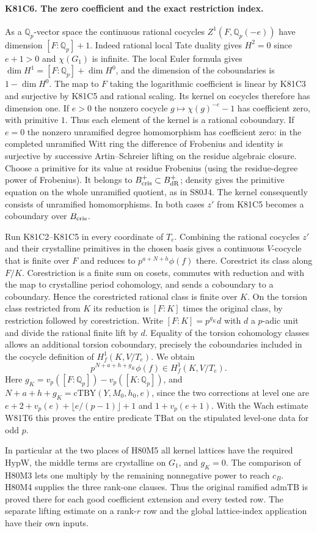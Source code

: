 \paragraph{K81C6. The zero coefficient and the exact restriction index.}
As a $\mathbb Q_p$-vector space the continuous rational cocycles
$Z^1(F,\mathbb Q_p(-e))$ have dimension $[F:\mathbb Q_p]+1$.
Indeed rational local Tate duality gives $H^2=0$ since $e+1>0$
and $\chi(G_1)$ is infinite. The local Euler formula gives
$\dim H^1=[F:\mathbb Q_p]+\dim H^0$, and the dimension of the
coboundaries is $1-\dim H^0$. The map to $F$ taking the logarithmic
coefficient is linear by K81C3 and surjective by K81C5 and
rational scaling. Its kernel on cocycles therefore has dimension
one. If $e>0$ the nonzero cocycle $g\mapsto\chi(g)^{-e}-1$ has
coefficient zero, with primitive $1$. Thus each element of the
kernel is a rational coboundary. If $e=0$ the nonzero unramified
degree homomorphism has coefficient zero: in the completed unramified
Witt ring the difference of Frobenius and identity is surjective
by successive Artin--Schreier lifting on the residue algebraic
closure. Choose a primitive for its value at residue Frobenius
(using the residue-degree power of Frobenius). It belongs to
$B_{\rm cris}^+\subset B_{\rm dR}^+$; density gives the primitive
equation on the whole unramified quotient, as in S80J4. The
kernel consequently consists of unramified homomorphisms. In both
cases $z'$ from K81C5 becomes a coboundary over $B_{\rm cris}$.

Run K81C2--K81C5 in every coordinate of $T_e$. Combining the
rational cocycles $z'$ and their crystalline primitives in the
chosen basis gives a continuous $V$-cocycle that is finite over
$F$ and reduces to $p^{a+N+h}\phi(f)$ there. Corestrict its
class along $F/K$. Corestriction is a finite sum on cosets,
commutes with reduction and with the map to crystalline period
cohomology, and sends a coboundary to a coboundary. Hence the
corestricted rational class is finite over $K$. On the torsion
class restricted from $K$ its reduction is $[F:K]$ times the
original class, by restriction followed by corestriction. Write
$[F:K]=p^{g_K}d$ with $d$ a $p$-adic unit and divide the rational
finite lift by $d$. Equality of the torsion cohomology classes
allows an additional torsion coboundary, precisely the coboundaries
included in the cocycle definition of $H_f^1(K,V/T_e)$. We obtain
\[
        p^{N+a+h+g_K}\phi(f)\in H_f^1(K,V/T_e).
\]
Here $g_K=v_p([F:\mathbb Q_p])-v_p([K:\mathbb Q_p])$, and
$N+a+h+g_K=\mathrm{cTBY}(Y,M_0,h_0,e)$, since the two
corrections at level one are
$e+2+v_p(e)+\lfloor e/(p-1)\rfloor+1$ and $1+v_p(e+1)$.
With the Wach estimate W81T6 this proves the entire predicate
$\mathrm{TBat}$ on the stipulated level-one data for odd $p$.

In particular at the two places of H80M5 all kernel lattices have
the required $\mathrm{HypW}$, the middle terms are crystalline
on $G_1$, and $g_K=0$. The comparison of H80M3 lets one multiply
by the remaining nonnegative power to reach $c_B$. H80M4 supplies
the three rank-one clauses. Thus the original ramified
$\mathrm{admTB}$ is proved there for each good coefficient extension
and every tested row. The separate lifting estimate on a rank-$r$
row and the global lattice-index application have their own inputs.
